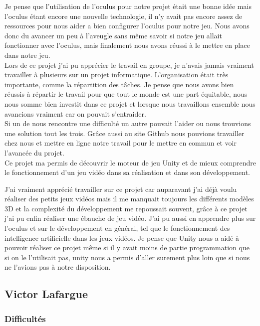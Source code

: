 \documentclass[12pt]{article}
\begin{document}
Je pense que l'utilisation de l'oculus pour notre projet était une bonne idée mais l'oculus étant encore une nouvelle technologie, il n'y avait pas encore assez de ressources pour nous aider a bien configurer l'oculus pour notre jeu. Nous avons donc du avancer un peu à l'aveugle sans même savoir si notre jeu allait fonctionner avec l'oculus, mais finalement nous avons réussi à le mettre en place dans notre jeu.\\

Lors de ce projet j'ai pu apprécier le travail en groupe, je n'avais jamais vraiment travailler à plusieurs sur un projet informatique. L'organisation était très importante, comme la répartition des tâches. Je pense que nous avons bien réussis à répartir le travail pour que tout le monde est une part équitable, nous nous somme bien investit dans ce projet et lorsque nous travaillons ensemble nous avancions vraiment car on pouvait s'entraider.\\
Si un de nous rencontre une difficulté un autre pouvait l'aider ou nous trouvions une solution tout les trois. Grâce aussi au site Github \cite{github} nous pouvions travailler chez nous et mettre en ligne notre travail pour le mettre en commun et voir l'avancée du projet.\\

Ce projet ma permis de découvrir le moteur de jeu Unity et de mieux comprendre le fonctionnement d'un jeu vidéo dans sa réalisation et dans son développement.

\newpage
 
J'ai vraiment apprécié travailler sur ce projet car auparavant j'ai déjà voulu réaliser des petits jeux vidéos mais il me manquait toujours les différents modèles 3D et la complexité du développement me repoussait souvent, grâce à ce projet j'ai pu enfin réaliser une ébauche de jeu vidéo. J'ai pu aussi en apprendre plus sur l'oculus et sur le développement en général, tel que le fonctionnement des intelligence artificielle dans les jeux vidéos. Je pense que Unity nous a aidé à pouvoir réaliser ce projet même si il y avait moins de partie programmation que si on le l'utilisait pas, unity nous a permis d'aller surement plus loin que si nous ne l'avions pas à notre disposition.


\subsection{Victor Lafargue}

\subsubsection{Difficultés}
\end{document}
